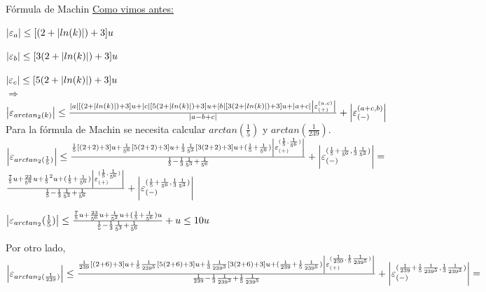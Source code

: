 \begin{subsection}{Fórmula de Machin}
	\underline{Como vimos antes:}
	
	$\left|\varepsilon _{a}\right| \leq [(2 + \left|ln(k)\right|) + 3]u$
	
	$\left|\varepsilon _{b}\right| \leq [3(2 + \left|ln(k)\right|) + 3]u$
	
	$\left|\varepsilon _{c}\right| \leq [5(2 + \left|ln(k)\right|) + 3]u$\\
	
	$\Rightarrow$\\
	$\left|\varepsilon _{arctan_2(k)}\right| \leq \frac{|a|[(2 + \left|ln(k)\right|) + 3]u + |c|[5(2 + \left|ln(k)\right|) + 3]u + |b|[3(2 + \left|ln(k)\right|) + 3]u + |a+c|\left|\varepsilon _{({+})}^{({a,c})}\right|}{|a-b+c|} + \left|\varepsilon _{({-})}^{({a+c,b})}\right|$\\
	
	Para la fórmula de Machin se necesita calcular $arctan(\frac{1}{5})$ y $arctan(\frac{1}{239})$.\\
	
	$\left|\varepsilon _{arctan_2(\frac{1}{5})}\right| \leq \frac{\frac{1}{5}[(2 + 2) + 3]u + \frac{1}{5^6}[5(2 + 2) + 3]u + \frac{1}{3}\frac{1}{5^3}[3(2 + 2) + 3]u + (\frac{1}{5}+\frac{1}{5^6})\left|\varepsilon _{({+})}^{({\frac{1}{5},\frac{1}{5^6}})}\right|}{\frac{1}{5}-\frac{1}{3}\frac{1}{5^3}+\frac{1}{5^6}} + \left|\varepsilon _{({-})}^{({\frac{1}{5}+\frac{1}{5^6},\frac{1}{3}\frac{1}{5^3}})}\right| =$\\
	
	$\frac{\frac{7}{5}u + \frac{23}{5^6}u +\frac{1}{5}^2u + (\frac{1}{5} + \frac{1}{5^6})\left|\varepsilon _{({+})}^{({\frac{1}{5},\frac{1}{5^6}})}\right|}{\frac{1}{5} - \frac{1}{3}\frac{1}{5^3} + \frac{1}{5^6}} + \left|\varepsilon _{({-})}^{({\frac{1}{5} + \frac{1}{5^6},\frac{1}{3}\frac{1}{5^3}})} \right|$\\
	
	\pa
	
	$\left| \varepsilon _{arctan_2}({\frac{1}{5}}) \right| \leq \frac{\frac{7}{5}u + \frac{23}{5^6}u +\frac{1}{5^2}u + (\frac{1}{5} + \frac{1}{5^6})u}{\frac{1}{5} - \frac{1}{3}\frac{1}{5^3} + \frac{1}{5^6}} + u \leq 10u$\\
	
	\pa
	
	Por otro lado,\\
	
	$\left|\varepsilon _{arctan_2(\frac{1}{239})}\right| \leq \frac{\frac{1}{239}[(2 + 6) + 3]u + \frac{1}{5}\frac{1}{239^5}[5(2 + 6) + 3]u + \frac{1}{3}\frac{1}{239^3}[3(2 + 6) + 3]u + (\frac{1}{239}+\frac{1}{5}\frac{1}{239^5})\left|\varepsilon _{({+})}^{({\frac{1}{239},\frac{1}{5}\frac{1}{239^5}})}\right|}{\frac{1}{239}-\frac{1}{3}\frac{1}{239^3}+\frac{1}{5}\frac{1}{239^5}} + \left|\varepsilon _{({-})}^{({\frac{1}{239}+\frac{1}{5}\frac{1}{239^5},\frac{1}{3}\frac{1}{239^3}})}\right| =$\\
	

\end{subsection}
